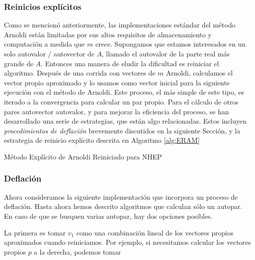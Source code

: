 \documentclass[a4paper,openright,12pt, oneside]{book}
\begin{document}
\subsubsection{Reinicios expl\'icitos}

Como se mencion\'o anteriormente, las implementaciones est\'andar del m\'etodo Arnoldi est\'an limitadas por sus altos requisitos de almacenamiento y computaci\'on a medida que $ m $ crece. Supongamos que estamos interesados en un solo autovalor / autovector de $ A $, llamado el autovalor de la parte real m\'as grande de $ A $. Entonces una manera de eludir la dificultad es reiniciar el algoritmo. Despu\'es de una corrida con vectores de $ m $ Arnoldi, calculamos el vector propio aproximado y lo usamos como vector inicial para la siguiente ejecuci\'on con el m\'etodo de Arnoldi. Este proceso, el m\'as simple de este tipo, es iterado a la convergencia para calcular un par propio. Para el c\'alculo de otros pares autovector autovalor, y para mejorar la eficiencia del proceso, se han desarrollado una serie de estrategias, que est\'an algo relacionadas. Estos incluyen \emph{procedimientos de deflaci\'on} brevemente discutidos en la siguiente Secci\'on, y la estrategia de reinicio expl\'icito descrita en Algoritmo \ref{alg:ERAM}

\begin{algorithm}
    \label{alg:ERAM}
    \caption{M\'etodo Expl\'icito de Arnoldi Reiniciado para NHEP}
\end{algorithm}

 \subsubsection{Deflaci\'on}

 Ahora consideramos la siguiente implementaci\'on que incorpora un proceso de deflaci\'on. Hasta ahora hemos descrito algoritmos que calculan s\'olo un autopar. En caso de que se busquen varias autopar, hay dos opciones posibles.

La primera es tomar $ v_1 $ como una combinaci\'on lineal de los vectores propios aproximados cuando reiniciamos. Por ejemplo, si necesitamos calcular los vectores propios $ p $ a la derecha, podemos tomar
\end{document}
